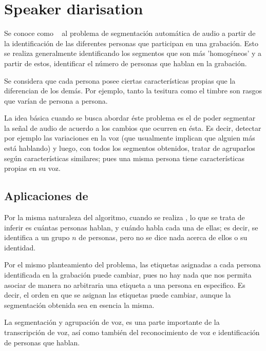 
\chapter{Speaker diarisation}\label{ch:chap5}

Se conoce como \SD~ al problema de segmentación 
automática de audio a partir de la identificación de las diferentes 
personas que participan en una grabación. Esto se realiza generalmente 
identificando los segmentos que son más 'homogéneos' y a partir 
de estos, identificar el número de personas que hablan en la grabación.

Se considera que cada persona posee ciertas características propias que la
diferencian de los demás. Por ejemplo, tanto la tesitura como el timbre son rasgos 
que varían de persona a persona.

La idea básica cuando se busca abordar éste problema es el de poder
segmentar la señal de audio de acuerdo a los cambios que 
ocurren en ésta. Es decir, detectar por ejemplo las variaciones en la voz 
(que usualmente implican que alguien más está hablando) y luego, con todos 
los segmentos obtenidos, tratar de agruparlos según características similares; 
pues una misma persona tiene características propias en su voz. 

\section{Aplicaciones de \sd}

Por la misma naturaleza del algoritmo, cuando se realiza \sd, lo 
que se trata de inferir es cuántas personas hablan, y cuándo habla cada una de ellas;
es decir, se identifica a un grupo $n$ de personas, pero no se dice nada acerca 
de ellos o su identidad. 

Por el mismo planteamiento del problema, las etiquetas asignadas a cada persona identificada
en la grabación puede cambiar, pues no hay nada que nos permita asociar de manera no arbitraria 
una etiqueta a una persona en especifico. Es decir, el orden en que se asignan las etiquetas 
puede cambiar, aunque la segmentación obtenida sea en esencia la misma.

La segmentación y agrupación de voz, es una parte importante de la 
transcripción de voz, así como también del reconocimiento de voz e identificación 
de personas que hablan. 

